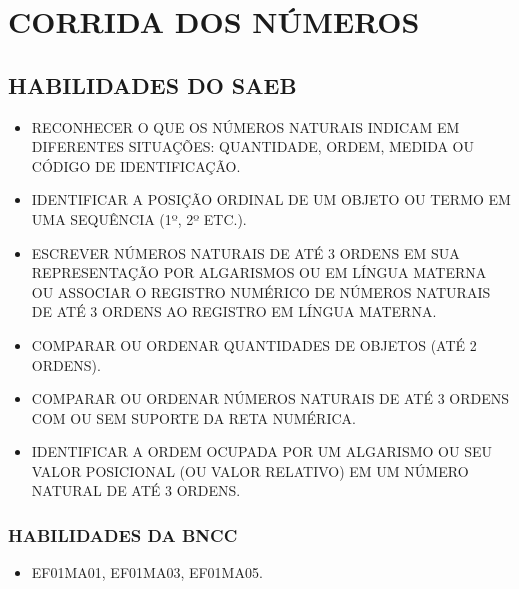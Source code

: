 \chapter{CORRIDA DOS NÚMEROS}


\section*{HABILIDADES DO SAEB}

\begin{itemize}
\item
  \uppercase{Reconhecer o que os números naturais indicam em diferentes situações:
  quantidade, ordem, medida ou código de identificação.}
\item
  \uppercase{Identificar a posição ordinal de um objeto ou termo em uma sequência
  (1º, 2º etc.).}
\item
  \uppercase{Escrever números naturais de até 3 ordens em sua representação por
  algarismos ou em língua materna ou associar o registro numérico de
  números naturais de até 3 ordens ao registro em língua materna.}
\item
  \uppercase{Comparar ou ordenar quantidades de objetos (até 2 ordens).}
\item
  \uppercase{Comparar ou ordenar números naturais de até 3 ordens com ou sem
  suporte da reta numérica.}
\item
  \uppercase{Identificar a ordem ocupada por um algarismo ou seu valor posicional
  (ou valor relativo) em um número natural de até 3 ordens.}
\end{itemize}

\subsection{HABILIDADES DA BNCC}

\begin{itemize}
  \item EF01MA01, EF01MA03, EF01MA05.
\end{itemize}

